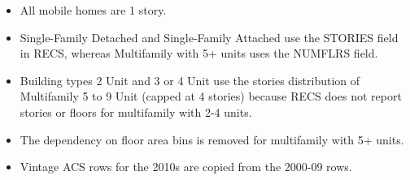 \begin{itemize}
\item All mobile homes are 1 story.
\item Single-Family Detached and Single-Family Attached use the STORIES field in RECS, whereas Multifamily with 5+ units uses the NUMFLRS field.
\item Building types 2 Unit and 3 or 4 Unit use the stories distribution of Multifamily 5 to 9 Unit (capped at 4 stories) because RECS does not report stories or floors for multifamily with 2-4 units.
\item The dependency on floor area bins is removed for multifamily with 5+ units.
\item Vintage ACS rows for the 2010s are copied from the 2000-09 rows.
\end{itemize}
